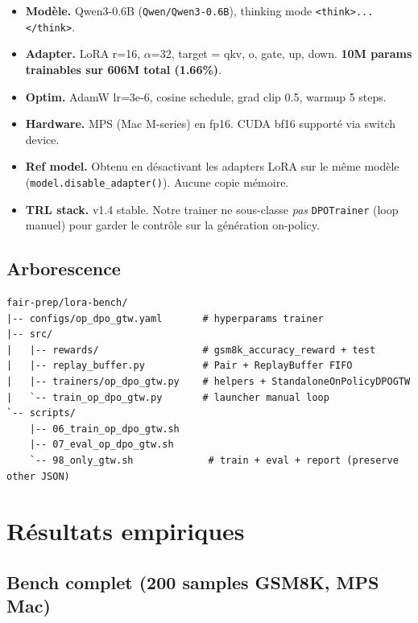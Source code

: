 \documentclass[10pt,a4paper]{article}
\begin{document}
\begin{itemize}[leftmargin=*]
  \item \textbf{Modèle.} Qwen3-0.6B (\texttt{Qwen/Qwen3-0.6B}), thinking mode \texttt{<think>...</think>}.
  \item \textbf{Adapter.} LoRA r=16, $\alpha$=32, target = qkv, o, gate, up, down. \textbf{10M params trainables sur 606M total (1.66\%)}.
  \item \textbf{Optim.} AdamW lr=3e-6, cosine schedule, grad clip 0.5, warmup 5 steps.
  \item \textbf{Hardware.} MPS (Mac M-series) en fp16. CUDA bf16 supporté via switch device.
  \item \textbf{Ref model.} Obtenu en désactivant les adapters LoRA sur le même modèle (\texttt{model.disable\_adapter()}). Aucune copie mémoire.
  \item \textbf{TRL stack.} v1.4 stable. Notre trainer ne sous-classe \emph{pas} \texttt{DPOTrainer} (loop manuel) pour garder le contrôle sur la génération on-policy.
\end{itemize}

\subsection{Arborescence}

\begin{lstlisting}
fair-prep/lora-bench/
|-- configs/op_dpo_gtw.yaml       # hyperparams trainer
|-- src/
|   |-- rewards/                  # gsm8k_accuracy_reward + test
|   |-- replay_buffer.py          # Pair + ReplayBuffer FIFO
|   |-- trainers/op_dpo_gtw.py    # helpers + StandaloneOnPolicyDPOGTW
|   `-- train_op_dpo_gtw.py       # launcher manual loop
`-- scripts/
    |-- 06_train_op_dpo_gtw.sh
    |-- 07_eval_op_dpo_gtw.sh
    `-- 98_only_gtw.sh             # train + eval + report (preserve other JSON)
\end{lstlisting}

\section{Résultats empiriques}

\subsection{Bench complet (200 samples GSM8K, MPS Mac)}
\end{document}
